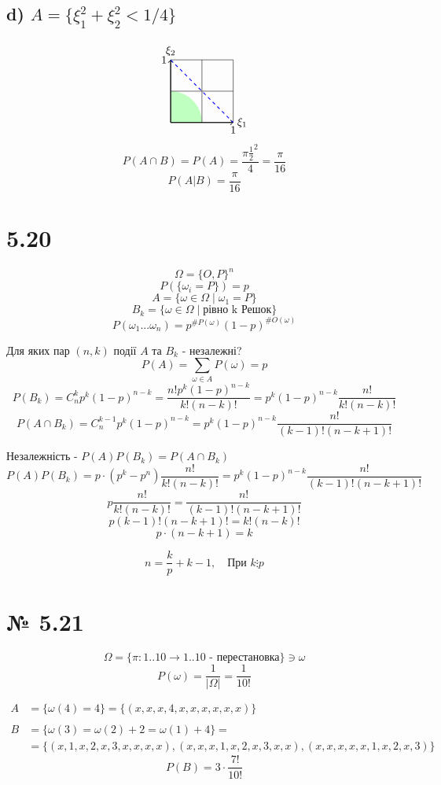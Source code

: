 \documentclass[11pt, a4paper]{article} %
\begin{document}
\subsection*{d) $A = \{\xi_1^2 + \xi_2^2 < 1/4\}$}
$$\begin{tikzpicture}
    \fill[green!25] (1,0) arc (0:90:1) -- (0,0) -- cycle;
    \draw[thin] (0,0) grid[step=1cm] (2,2);
    \draw[thick,->] (0,0) -- (0,2) node[above] {$\xi_2$};
    \draw[thick,->] (0,0) -- (2,0) node[right] {$\xi_1$};
    \node[below] at (2,0) {$1$};
    \node[left] at (0,2) {$1$};
    \draw[blue, thick, dashed] (0,2) -- (1,1) -- (2,0);
\end{tikzpicture}$$
$$P(A \cap B) = P(A) = \frac{\pi \frac{1}{2}^2}{4} = \frac{\pi}{16}$$
$$P(A|B) = \frac{\pi}{16}$$


\section*{5.20}
$$\Omega = \{O, P\}^n$$
$$P(\{\omega_i = P\}) = p$$
$$A = \{\omega \in \Omega \;|\; \omega_1 = P\}$$
$$B_k = \{\omega \in \Omega \;|\; \text{рівно k Решок}\}$$
$$P(\omega_1 ... \omega_n) = p^{\#P(\omega)}(1-p)^{\#O(\omega)}$$

Для яких пар $(n,k)$ події $A$ та $B_k$ - незалежні?
$$P(A) = \sum_{\omega \in A}P(\omega) = p$$
$$P(B_k) = C_n^k p^k(1-p)^{n-k} = \frac{n! p^k (1-p)^{n-k}}{k!(n-k)!}
= p^k(1-p)^{n-k} \frac{n!}{k!(n-k)!}$$
$$P(A\cap B_k) = C_n^{k-1}p^k(1-p)^{n-k} = p^k(1-p)^{n-k} \frac{n!}{(k-1)!(n-k+1)!}$$


Незалежність - $P(A)P(B_k) = P(A\cap B_k)$
$$P(A)P(B_k) = p \cdot (p^{k}-p^{n}) \frac{n!}{k!(n-k)!} =  p^k(1-p)^{n-k} \frac{n!}{(k-1)!(n-k+1)!}$$
$$p\frac{n!}{k!(n-k)!} = \frac{n!}{(k-1)!(n-k+1)!}$$
$$p (k-1)!(n-k+1)! = k!(n-k)!$$
$$p \cdot (n-k+1) = k$$
\begin{mdframed}[style=ans]
    $$n = \frac{k}{p}+k-1,\quad \text{При } k\vdots p$$
\end{mdframed}

\section*{№ 5.21}
$$\Omega = \{\pi: {1..10} \to {1..10} \text{ - перестановка}\} \ni \omega$$
$$P(\omega) = \frac{1}{|\Omega|} = \frac{1}{10!}$$

\begin{align*}
    A &= \{\omega(4) = 4\} = \{(x,x,x,4,x,x,x,x,x,x)\}\\ \\
    B &= \{\omega(3) = \omega(2)+2 = \omega(1)+4\} = \\
    &= \{(x,1,x,2,x,3,x,x,x,x), (x,x,x,1,x,2,x,3,x,x), (x,x,x,x,x,1,x,2,x,3)\}
\end{align*}
$$P(B) = 3\cdot \frac{7!}{10!}$$
\end{document}
